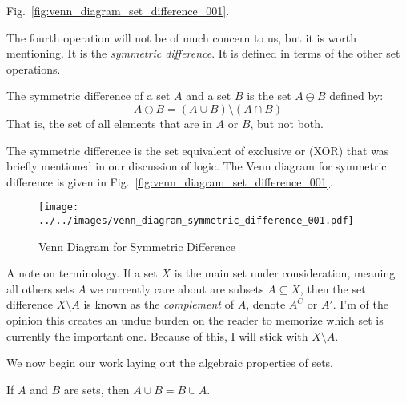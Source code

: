             Fig.~\ref{fig:venn_diagram_set_difference_001}.
            \par\hfill\par
            The fourth operation will not be of much concern to us, but it is
            worth mentioning. It is the \textit{symmetric difference}. It is
            defined in terms of the other set operations.
            \begin{definition}
                The symmetric difference of a set $A$ and a set $B$ is the
                set $A\ominus{B}$ defined by:
                \begin{equation}
                    A\ominus{B}=(A\cup{B})\setminus(A\cap{B})
                \end{equation}
                That is, the set of all elements that are in $A$ or $B$, but
                not both.
            \end{definition}
            The symmetric difference is the set equivalent of exclusive or
            (XOR) that was briefly mentioned in our discussion of logic.
            The Venn diagram for symmetric difference is given in
            Fig.~\ref{fig:venn_diagram_set_difference_001}.
            \begin{figure}[H]
                \centering
                \texttt{[image: ../../images/venn\_diagram\_symmetric\_difference\_001.pdf]}
                \caption{Venn Diagram for Symmetric Difference}
                \label{fig:venn_diagram_symmetric_difference_001}
            \end{figure}
            A note on terminology. If a set $X$ is the main set under
            consideration, meaning all others sets $A$ we currently care about
            are subsets $A\subseteq{X}$, then the set difference
            $X\setminus{A}$ is known as the
            \textit{complement}
            of $A$, denote $A^{C}$ or $A'$. I'm of the opinion this creates an
            undue burden on the reader to memorize which set is currently the
            important one. Because of this, I will stick with
            $X\setminus{A}$.
            \par\hfill\par
            We now begin our work laying out the algebraic properties of sets.
            \begin{theorem}
                If $A$ and $B$ are sets, then
                $A\cup{B}=B\cup{A}$.
            \end{theorem}
